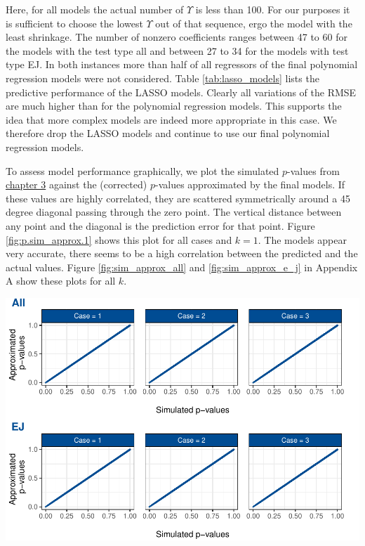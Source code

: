 \documentclass[12pt,a4paper]{article}
\let\origfigure\figure
\let\endorigfigure\endfigure
\renewenvironment{figure}[1][2] {
    \expandafter\origfigure\expandafter[H]
} {
    \endorigfigure
}
\begin{document}
Here, for all models the actual number of \(\Upsilon\) is less than 100.
For our purposes it is sufficient to choose the lowest \(\Upsilon\) out
of that sequence, ergo the model with the least shrinkage. The number of
nonzero coefficients ranges between 47 to 60 for the models with the
test type all and between 27 to 34 for the models with test type EJ. In
both instances more than half of all regressors of the final polynomial
regression models were not considered. Table \ref{tab:lasso_models}
lists the predictive performance of the \ac{LASSO} models. Clearly all
variations of the \ac{RMSE} are much higher than for the polynomial
regression models. This supports the idea that more complex models are
indeed more appropriate in this case. We therefore drop the \ac{LASSO}
models and continue to use our final polynomial regression models.

To assess model performance graphically, we plot the simulated
\(p\)-values from \protect\hyperlink{simulation}{chapter 3} against the
(corrected) \(p\)-values approximated by the final models. If these
values are highly correlated, they are scattered symmetrically around a
45 degree diagonal passing through the zero point. The vertical distance
between any point and the diagonal is the prediction error for that
point. Figure \ref{fig:p.sim_approx.1} shows this plot for all cases and
\(k = 1\). The models appear very accurate, there seems to be a high
correlation between the predicted and the actual values. Figure
\ref{fig:sim_approx_all} and \ref{fig:sim_approx_e_j} in Appendix A show
these plots for all \(k\).

\begin{figure}
\centering
\includegraphics{p_approx_paper_files/figure-latex/p.sim_aprox.k1-1.pdf}
\caption{\label{fig:p.sim_approx.1} Simulated \(p\)-values plotted
against \(p\)-values approximated by final (corrected) models, exemplary
for \(k = 1\).}
\end{figure}
\end{document}
